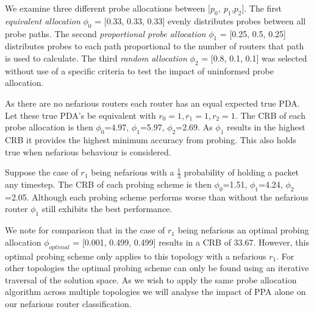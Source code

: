 We examine three different probe allocations between [$p_0,\:p_1$,\:$p_2$]. The first \textit{equivalent allocation} $\phi_0$ = [0.33, 0.33, 0.33] evenly distributes probes between all probe paths. The second \textit{proportional probe allocation} $\phi_1$ = [0.25, 0.5, 0.25] distributes probes to each path proportional to the number of routers that path is used to calculate. The third \textit{random allocation} $\phi_2$ = [0.8, 0.1, 0.1] was selected without use of a specific criteria to test the impact of uninformed probe allocation.\par
As there are no nefarious routers each router has an equal expected true PDA. Let these true PDA's be equivalent with $r_0=1, r_1=1, r_2=1$. The CRB of each probe allocation is then $\phi_0$=4.97, $\phi_1$=5.97, $\phi_2$=2.69. As $\phi_1$ results in the highest CRB it provides the highest minimum accuracy from probing. This also holds true when nefarious behaviour is considered.\par
Suppose the case of $r_1$ being nefarious with a $\frac{1}{3}$ probability of holding a packet any timestep. The CRB of each probing scheme is then $\phi_0$=1.51, $\phi_1$=4.24, $\phi_2$=2.05. Although each probing scheme performs worse than without the nefarious router $\phi_1$ still exhibits the best performance.\par
We note for comparison that in the case of $r_1$ being nefarious an optimal probing allocation $\phi_{optimal}$ = [0.001, 0.499, 0.499] results in a CRB of 33.67. However, this optimal probing scheme only applies to this topology with a nefarious $r_1$. For other topologies the optimal probing scheme can only be found using an iterative traversal of the solution space. As we wish to apply the same probe allocation algorithm across multiple topologies we will analyse the impact of PPA alone on our nefarious router classification.

